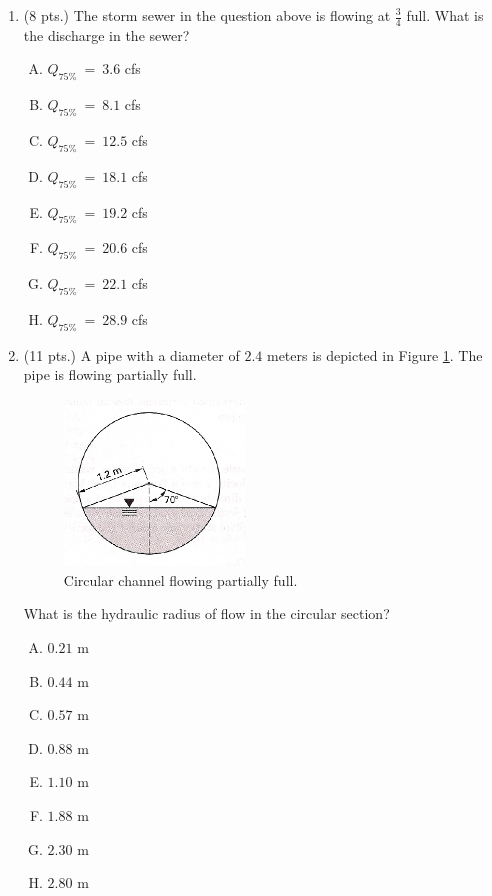 \documentclass[11pt]{article}
\begin{document}
\begin{enumerate}
\clearpage
\item (8 pts.)
The storm sewer in the question above is flowing at $\frac{3}{4}$ full.  What is the discharge in the sewer?
\begin{enumerate} [(A)]
\item  $Q_{75\%}~=~3.6$ cfs
\item  $Q_{75\%}~=~8.1$ cfs
\item  $Q_{75\%}~=~12.5$ cfs
\item  $Q_{75\%}~=~18.1$ cfs
\item  $Q_{75\%}~=~19.2$ cfs
\item  $Q_{75\%}~=~20.6$ cfs
\item  $Q_{75\%}~=~22.1$ cfs
\item  $Q_{75\%}~=~28.9$ cfs
\end{enumerate}
\item  (11 pts.)
A pipe with a diameter of $2.4$ meters is depicted in Figure \ref{fig:CircularSewerToo}.   The pipe is flowing partially full.

\begin{figure}[h!] %
\centering
   \includegraphics[width=1.9in]{CircularSewerToo.jpg}
   \caption{Circular channel flowing partially full.}
   \label{fig:CircularSewerToo} 
\end{figure}

What is the hydraulic radius of flow in the circular section?
\begin{enumerate} [(A)]
\item $0.21$ m
\item $0.44$ m
\item $0.57$ m
\item $0.88$ m
\item $1.10$ m
\item $1.88$ m
\item $2.30$ m
\item $2.80$ m
\end{enumerate}


\end{enumerate}
\end{document}
